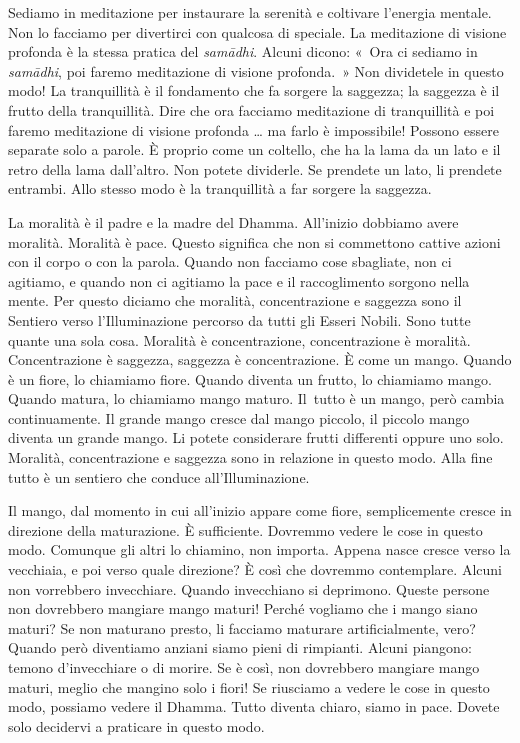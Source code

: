 Sediamo in meditazione per instaurare la serenità e coltivare l'energia
mentale. Non lo facciamo per divertirci con qualcosa di speciale. La
meditazione di visione profonda è la stessa pratica del \emph{samādhi}.
Alcuni dicono: «~Ora ci sediamo in \emph{samādhi}, poi faremo
meditazione di visione profonda.~» Non dividetele in questo modo! La
tranquillità è il fondamento che fa sorgere la saggezza; la saggezza è
il frutto della tranquillità. Dire che ora facciamo meditazione di
tranquillità e poi faremo meditazione di visione profonda \ldots{} ma farlo è
impossibile! Possono essere separate solo a parole. È proprio come un
coltello, che ha la lama da un lato e il retro della lama dall'altro.
Non potete dividerle. Se prendete un lato, li prendete entrambi. Allo
stesso modo è la tranquillità a far sorgere la saggezza.

La moralità è il padre e la madre del Dhamma. All'inizio dobbiamo avere
moralità. Moralità è pace. Questo significa che non si commettono
cattive azioni con il corpo o con la parola. Quando non facciamo cose
sbagliate, non ci agitiamo, e quando non ci agitiamo la pace e il
raccoglimento sorgono nella mente. Per questo diciamo che moralità,
concentrazione e saggezza sono il Sentiero verso l'Illuminazione
percorso da tutti gli Esseri Nobili. Sono tutte quante una sola cosa.
Moralità è concentrazione, concentrazione è moralità. Concentrazione è
saggezza, saggezza è concentrazione. È come un mango. Quando è un fiore,
lo chiamiamo fiore. Quando diventa un frutto, lo chiamiamo mango. Quando
matura, lo chiamiamo mango maturo. Il~tutto è un mango, però cambia
continuamente. Il grande mango cresce dal mango piccolo, il piccolo
mango diventa un grande mango. Li potete considerare frutti differenti
oppure uno solo. Moralità, concentrazione e saggezza sono in relazione
in questo modo. Alla fine tutto è un sentiero che conduce
all'Illuminazione.

Il mango, dal momento in cui all'inizio appare come fiore, semplicemente
cresce in direzione della maturazione. È sufficiente. Dovremmo vedere le
cose in questo modo. Comunque gli altri lo chiamino, non importa. Appena
nasce cresce verso la vecchiaia, e poi verso quale direzione? È così che
dovremmo contemplare. Alcuni non vorrebbero invecchiare. Quando
invecchiano si deprimono. Queste persone non dovrebbero mangiare mango
maturi! Perché vogliamo che i mango siano maturi? Se non maturano
presto, li facciamo maturare artificialmente, vero? Quando però
diventiamo anziani siamo pieni di rimpianti. Alcuni piangono: temono
d'invecchiare o di morire. Se è così, non dovrebbero mangiare mango
maturi, meglio che mangino solo i fiori! Se riusciamo a vedere le cose
in questo modo, possiamo vedere il Dhamma. Tutto diventa chiaro, siamo
in pace. Dovete solo decidervi a praticare in questo modo.

